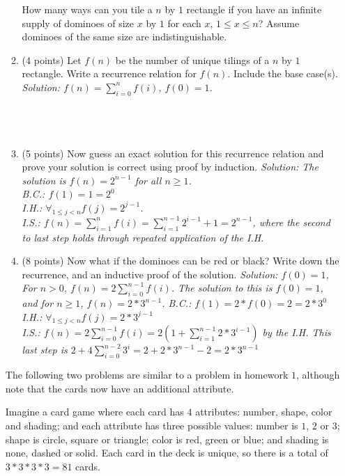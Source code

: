 \documentclass[11pt]{article}
\newcommand{\ans}[1]{\emph{Solution: #1}}
\begin{document}
\begin{enumerate}
\begin{enumerate}
\pagebreak

 
 How many ways can you tile a $n$ by $1$ rectangle if you have an infinite supply of dominoes of size $x$ by $1$ for each $x$, $1 \leq x \leq n$?  Assume dominoes of the same size are indistinguishable.
 
 \item (4 points) Let $f(n)$ be the number of unique tilings of a $n$ by $1$ rectangle.  Write a recurrence relation for $f(n)$.  Include the base case(s).
 \ans{$f(n) = \sum_{i=0}^{n} f(i)$, $f(0) = 1$.} \\ \ \\ \ \\ \ \\
 
 \item (5 points) Now guess an exact solution for this recurrence relation and prove your solution is correct using proof by induction.
\ans{The solution is $f(n) = 2^{n-1}$ for all $n \geq 1$.\\ B.C.:  $f(1) = 1 = 2^{0}$ \\ I.H.: $\forall_{1 \leq j < n} f(j) = 2^{j-1}$.\\  I.S.: $f(n) = \sum_{i=1}^{n} f(i) =  \sum_{i=1}^{n-1} 2^{i-1} + 1 = 2^{n-1}$, where the second to last step holds through repeated application of the I.H.}  

\pagebreak

\item (8 points) Now what if the dominoes can be red or black?  Write down the recurrence, and an inductive proof of the solution.
\ans{$f(0) = 1$, For $n>0$, $f(n) = 2 \sum_{i=0}^{n-1} f(i)$.  The solution to this is $f(0) = 1$, and for $n \geq 1$, $f(n) = 2*3^{n-1}$. 
B.C.: $f(1) = 2*f(0) = 2 = 2*3^{0}$\\
I.H.: $\forall_{1 \leq j < n} f(j) = 2*3^{j-1}$\\
I.S.: $f(n) = 2 \sum_{i=0}^{n-1} f(i) = 2 (1 + \sum_{i=1}^{n-1} 2*3^{i-1})$ by the I.H.  This last step is $2 + 4\sum_{i=0}^{n-2} 3^{i} = 2 + 2*3^{n-1} - 2 = 2*3^{n-1} $}


 \end{enumerate}

 
 
 The following two problems are similar to a problem in homework $1$, although note that the cards now have an additional attribute.
 
 Imagine a card game where each card has $4$ attributes: number, shape, color and shading; and each attribute has three possible values: number is $1$, $2$ or $3$; shape is circle, square or triangle; color is red, green or blue; and shading is none, dashed or solid.  Each card in the deck is unique, so there is a total of $3*3*3*3 = 81$ cards.
 

\end{enumerate}
\end{document}

